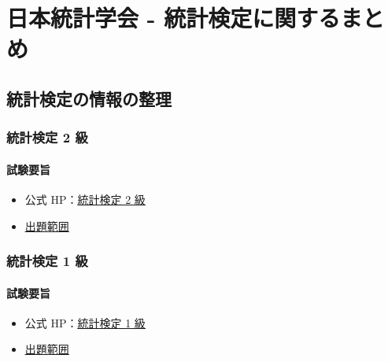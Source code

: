 
\part{日本統計学会 - 統計検定に関するまとめ}

\chapter{統計検定の情報の整理}

\section{統計検定 2 級}

\subsection{試験要旨}

\begin{itemize}
  \item 公式 HP：\underline{\href{https://www.toukei-kentei.jp/about/grade2/}{統計検定 2 級}}
  \item \underline{\href{https://www.toukei-kentei.jp/wp-content/uploads/grade2_hani_181214.pdf}{出題範囲}}
\end{itemize}

\newpage

\section{統計検定 1 級}

\subsection{試験要旨}

\begin{itemize}
  \item 公式 HP：\underline{\href{https://www.toukei-kentei.jp/about/grade1/}{統計検定 1 級}}
  \item \underline{\href{https://www.toukei-kentei.jp/wp-content/uploads/grade1_hani150508_2.pdf}{出題範囲}}
\end{itemize}
